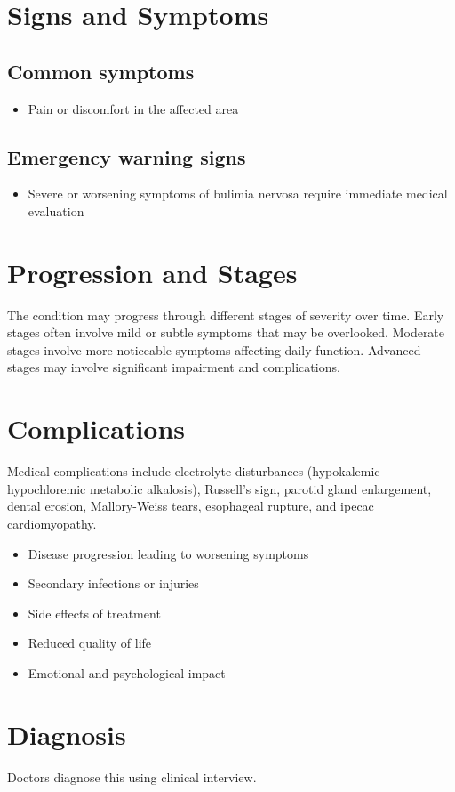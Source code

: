 \section{Signs and Symptoms}
\subsection{Common symptoms}
\begin{itemize}[noitemsep]
  \item Pain or discomfort in the affected area
  \end{itemize}
\subsection{Emergency warning signs}
\begin{itemize}[noitemsep]
  \item Severe or worsening symptoms of bulimia nervosa require immediate medical evaluation
\end{itemize}
\section{Progression and Stages}
The condition may progress through different stages of severity over time. Early stages often involve mild or subtle symptoms that may be overlooked. Moderate stages involve more noticeable symptoms affecting daily function. Advanced stages may involve significant impairment and complications.
\section{Complications}
Medical complications include electrolyte disturbances (hypokalemic hypochloremic metabolic alkalosis), Russell's sign, parotid gland enlargement, dental erosion, Mallory-Weiss tears, esophageal rupture, and ipecac cardiomyopathy.

\begin{itemize}[noitemsep]
  \item Disease progression leading to worsening symptoms
  \item Secondary infections or injuries
  \item Side effects of treatment
  \item Reduced quality of life
  \item Emotional and psychological impact
\end{itemize}
\section{Diagnosis}
Doctors diagnose this using clinical interview.

